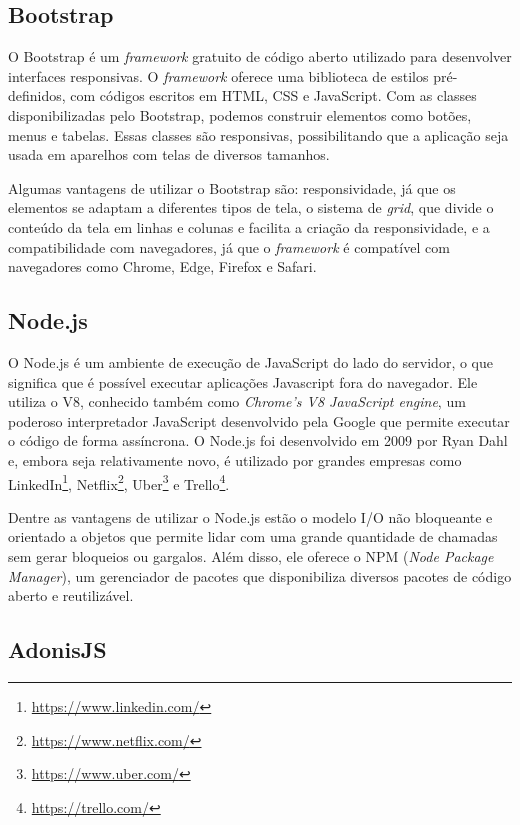 \subsection{Bootstrap}

O Bootstrap é um \textit{framework} gratuito de código aberto utilizado para desenvolver interfaces responsivas. O \textit{framework} oferece uma biblioteca de estilos pré-definidos, com códigos escritos em HTML, CSS e JavaScript. Com as classes disponibilizadas pelo Bootstrap, podemos construir elementos como botões, menus e tabelas. Essas classes são responsivas, possibilitando que a aplicação seja usada em aparelhos com telas de diversos tamanhos.

Algumas vantagens de utilizar o Bootstrap são: responsividade, já que os elementos se adaptam a diferentes tipos de tela, o sistema de \textit{grid}, que divide o conteúdo da tela em linhas e colunas e facilita a criação da responsividade, e a compatibilidade com navegadores, já que o \textit{framework} é compatível com navegadores como Chrome, Edge, Firefox e Safari.

\subsection{Node.js}

O Node.js é um ambiente de execução de JavaScript do lado do servidor, o que significa que é possível executar aplicações Javascript fora do navegador. Ele utiliza o V8, conhecido também como \textit{Chrome’s V8 JavaScript engine}, um poderoso interpretador JavaScript desenvolvido pela Google que permite executar o código de forma assíncrona. O Node.js foi desenvolvido em 2009 por Ryan Dahl e, embora seja relativamente novo, é utilizado por grandes empresas como LinkedIn\footnote{\url{https://www.linkedin.com/}}, Netflix\footnote{\url{https://www.netflix.com/}}, Uber\footnote{\url{https://www.uber.com/}} e Trello\footnote{\url{https://trello.com/}}. \cite{brewster_2021}

Dentre as vantagens de utilizar o Node.js estão o modelo I/O não bloqueante e orientado a objetos que permite lidar com uma grande quantidade de chamadas sem gerar bloqueios ou gargalos. Além disso, ele oferece o NPM (\textit{Node Package Manager}), um gerenciador de pacotes que disponibiliza diversos pacotes de código aberto e reutilizável.


\subsection{AdonisJS}

